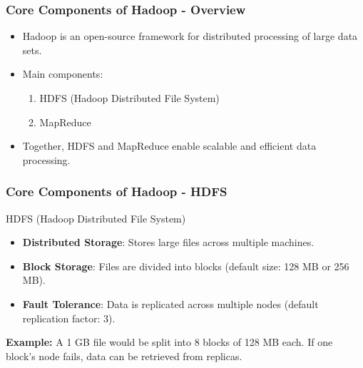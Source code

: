 \documentclass[aspectratio=169]{beamer}
\begin{document}
\begin{frame}[fragile]
    \frametitle{Core Components of Hadoop - Overview}
    \begin{itemize}
        \item Hadoop is an open-source framework for distributed processing of large data sets.
        \item Main components:
        \begin{enumerate}
            \item HDFS (Hadoop Distributed File System)
            \item MapReduce
        \end{enumerate}
        \item Together, HDFS and MapReduce enable scalable and efficient data processing.
    \end{itemize}
\end{frame}

\begin{frame}[fragile]
    \frametitle{Core Components of Hadoop - HDFS}
    \begin{block}{HDFS (Hadoop Distributed File System)}
        \begin{itemize}
            \item \textbf{Distributed Storage}: Stores large files across multiple machines.
            \item \textbf{Block Storage}: Files are divided into blocks (default size: 128 MB or 256 MB).
            \item \textbf{Fault Tolerance}: Data is replicated across multiple nodes (default replication factor: 3).
        \end{itemize}
    \end{block}
    \pause
    \textbf{Example:} A 1 GB file would be split into 8 blocks of 128 MB each. If one block's node fails, data can be retrieved from replicas.
\end{frame}
\end{document}
